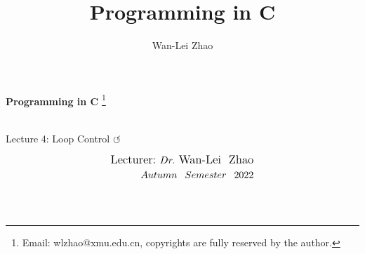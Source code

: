 \documentclass[]{beamer}
\title{Programming in C}
\institute{Xiamen University}
\author[Wan-Lei Zhao]{Wan-Lei Zhao}
\newcommand\blfootnote[1]{
  \begingroup
  \renewcommand\thefootnote{}\footnote{#1}
  \addtocounter{footnote}{-1}
  \endgroup
}
\begin{document}
\begin{frame}
   \begin{center}
    \vspace{24pt}
    \Huge\textbf{Programming in C}\blfootnote{Email: wlzhao@xmu.edu.cn, copyrights are fully reserved by the author.}\\
     \Huge{Lecture 4: Loop Control $\circlearrowleft$}
    \vspace{36pt}
  \end{center}
  \begin{align*}
   \vspace{18pt}
      \large{\mbox{Lecturer:}~Dr.~\mbox{Wan-Lei~~Zhao}} \\
      \large{Autumn~~Semester~~2022} \\
   \vspace{30pt}
  \end{align*}
\end{frame}




\section{}
\end{document}

